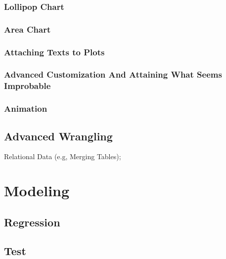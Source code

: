 \documentclass[
]{book}
\begin{document}
\hypertarget{lollipop-chart}{%
\subsection{Lollipop Chart}\label{lollipop-chart}}

\hypertarget{area-chart}{%
\subsection{Area Chart}\label{area-chart}}

\hypertarget{attaching-texts-to-plots}{%
\subsection{Attaching Texts to Plots}\label{attaching-texts-to-plots}}

\hypertarget{advanced-customization-and-attaining-what-seems-improbable}{%
\subsection{Advanced Customization And Attaining What Seems Improbable}\label{advanced-customization-and-attaining-what-seems-improbable}}

\hypertarget{animation}{%
\subsection{Animation}\label{animation}}

\hypertarget{advanced-wrangling}{%
\section{Advanced Wrangling}\label{advanced-wrangling}}

Relational Data (e.g, Merging Tables);

\hypertarget{modeling}{%
\chapter{Modeling}\label{modeling}}

\hypertarget{regression}{%
\section{Regression}\label{regression}}

\hypertarget{test}{%
\section{Test}\label{test}}

  
\end{document}
